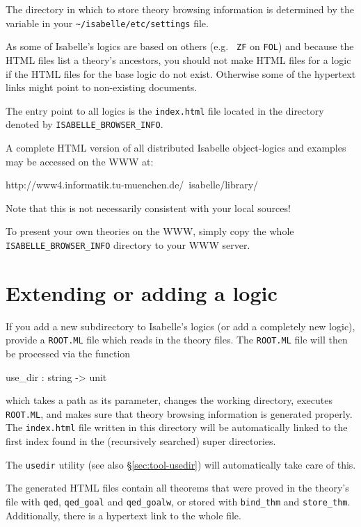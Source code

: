 The directory in which to store theory browsing information is determined 
by the  variable in your \texttt{\~\relax/isabelle/etc/settings}
file.

\medskip As some of Isabelle's logics are based on others (e.g. {\tt
  ZF} on {\tt FOL}) and because the HTML files list a theory's
ancestors, you should not make HTML files for a logic if the HTML
files for the base logic do not exist. Otherwise some of the hypertext
links might point to non-existing documents.

The entry point to all logics is the {\tt index.html} file located in
the directory denoted by \texttt{ISABELLE_BROWSER_INFO}.

A complete HTML version of all distributed Isabelle object-logics and
examples may be accessed on the WWW at:
\begin{ttbox}
http://www4.informatik.tu-muenchen.de/~isabelle/library/
\end{ttbox}
Note that this is not necessarily consistent with your local sources!

To present your own theories on the WWW, simply copy the whole
\texttt{ISABELLE_BROWSER_INFO} directory to your WWW server.

\section{Extending or adding a logic}

If you add a new subdirectory to Isabelle's logics (or add a
completely new logic), provide a {\tt ROOT.ML} file which reads in the
theory files. The {\tt ROOT.ML} file will then be processed via the function

\begin{ttbox}
use_dir : string -> unit
\end{ttbox}

which takes a path as its parameter, changes the working
directory, executes {\tt ROOT.ML}, and makes sure that theory browsing information
is generated properly. The {\tt index.html} file written in this directory will
be automatically linked to the first index found in the (recursively searched)
super directories.

The \texttt{usedir} utility (see also \S\ref{sec:tool-usedir}) will
automatically take care of this.

\medskip The generated HTML files contain all theorems that were
proved in the theory's \ML{} file with {\tt qed}, {\tt qed_goal} and
{\tt qed_goalw}, or stored with {\tt bind_thm} and {\tt store_thm}.
Additionally, there is a hypertext link to the whole \ML{} file.

